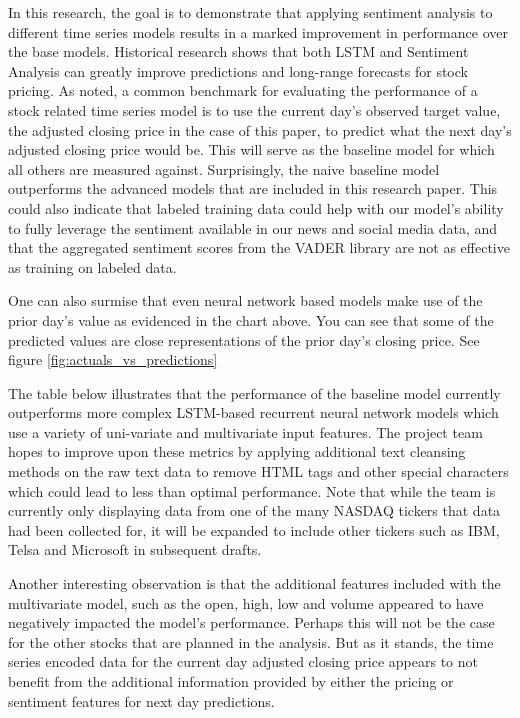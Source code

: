 \documentclass{llncs}
\begin{document}
In this research, the goal is to demonstrate that applying sentiment analysis to different time series models results in a marked improvement in performance over the base models.  Historical research shows that both LSTM and Sentiment Analysis can greatly improve predictions and long-range forecasts for stock pricing.  As noted, a common benchmark for evaluating the performance of a stock related time series model is to use the current day's observed target value, the adjusted closing price in the case of this paper, to predict what the next day's adjusted closing price would be.  This will serve as the baseline model for which all others are measured against.  Surprisingly, the naive baseline model outperforms the advanced models that are included in this research paper.  This could also indicate that labeled training data could help with our model's ability to fully leverage the sentiment available in our news and social media data, and that the aggregated sentiment scores from the VADER library are not as effective as training on labeled data.

One can also surmise that even neural network based models make use of the prior day's value as evidenced in the chart above.  You can see that some of the predicted values are close representations of the prior day's closing price.  See figure \ref{fig:actuals_vs_predictions}

The table below illustrates that the performance of the baseline model currently outperforms more complex LSTM-based recurrent neural network models which use a variety of uni-variate and multivariate input features.  The project team hopes to improve upon these metrics by applying additional text cleansing methods on the raw text data to remove HTML tags and other special characters which could lead to less than optimal performance.  Note that while the team is currently only displaying data from one of the many NASDAQ tickers that data had been collected for, it will be expanded to include other tickers such as IBM, Telsa and Microsoft in subsequent drafts.

Another interesting observation is that the additional features included with the multivariate model, such as the open, high, low and volume appeared to have negatively impacted the model's performance.  Perhaps this will not be the case for the other stocks that are planned in the analysis.  But as it stands, the time series encoded data for the current day adjusted closing price appears to not benefit from the additional information provided by either the pricing or sentiment features for next day predictions.
\end{document}
